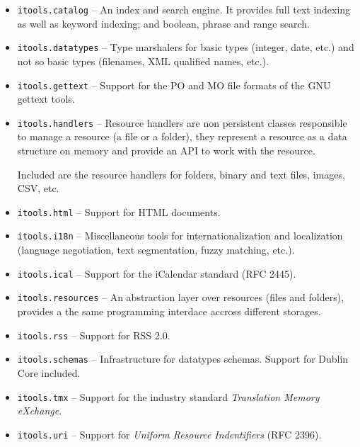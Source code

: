 \begin{itemize}
  \item {\tt itools.catalog} -- An index and search engine. It provides
    full text indexing as well as keyword indexing; and boolean, phrase
    and range search.

  \item {\tt itools.datatypes} -- Type marshalers for basic types (integer,
    date, etc.) and not so basic types (filenames, XML qualified names, etc.).

  \item {\tt itools.gettext} -- Support for the PO and MO file formats of
    the GNU gettext tools.

  \item {\tt itools.handlers} -- Resource handlers are non persistent classes
    responsible to manage a resource (a file or a folder), they represent a
    resource as a data structure on memory and provide an API to work with
    the resource.

    Included are the resource handlers for folders, binary and text files,
    images, CSV, etc.

  \item {\tt itools.html} -- Support for HTML documents.

  \item {\tt itools.i18n} -- Miscellaneous tools for internationalization
    and localization (language negotiation, text segmentation, fuzzy
    matching, etc.).

  \item {\tt itools.ical} -- Support for the iCalendar standard (RFC 2445).

  \item {\tt itools.resources} -- An abstraction layer over resources (files
    and folders), provides a the same programming interdace accross different
    storages.

  \item {\tt itools.rss} -- Support for RSS 2.0.

  \item {\tt itools.schemas} -- Infrastructure for datatypes schemas. Support
    for Dublin Core included.

  \item {\tt itools.tmx} -- Support for the industry standard
    {\em Translation Memory eXchange}.

  \item {\tt itools.uri} -- Support for {\em Uniform Resource Indentifiers}
    (RFC 2396).


\end{itemize}
